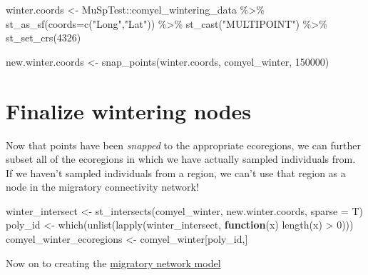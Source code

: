 \documentclass[
]{book}
\newenvironment{Shaded}{\begin{snugshade}}{\end{snugshade}}
\newcommand{\AttributeTok}[1]{\textcolor[rgb]{0.77,0.63,0.00}{#1}}
\newcommand{\ControlFlowTok}[1]{\textcolor[rgb]{0.13,0.29,0.53}{\textbf{#1}}}
\newcommand{\DecValTok}[1]{\textcolor[rgb]{0.00,0.00,0.81}{#1}}
\newcommand{\FunctionTok}[1]{\textcolor[rgb]{0.00,0.00,0.00}{#1}}
\newcommand{\NormalTok}[1]{#1}
\newcommand{\OtherTok}[1]{\textcolor[rgb]{0.56,0.35,0.01}{#1}}
\newcommand{\SpecialCharTok}[1]{\textcolor[rgb]{0.00,0.00,0.00}{#1}}
\newcommand{\StringTok}[1]{\textcolor[rgb]{0.31,0.60,0.02}{#1}}
\begin{document}
\begin{Shaded}
\begin{Highlighting}[]
\NormalTok{winter.coords }\OtherTok{\textless{}{-}}\NormalTok{ MuSpTest}\SpecialCharTok{::}\NormalTok{comyel\_wintering\_data }\SpecialCharTok{\%\textgreater{}\%}
  \FunctionTok{st\_as\_sf}\NormalTok{(}\AttributeTok{coords=}\FunctionTok{c}\NormalTok{(}\StringTok{"Long"}\NormalTok{,}\StringTok{"Lat"}\NormalTok{)) }\SpecialCharTok{\%\textgreater{}\%}
  \FunctionTok{st\_cast}\NormalTok{(}\StringTok{"MULTIPOINT"}\NormalTok{) }\SpecialCharTok{\%\textgreater{}\%}
  \FunctionTok{st\_set\_crs}\NormalTok{(}\DecValTok{4326}\NormalTok{)}
  
\NormalTok{new.winter.coords }\OtherTok{\textless{}{-}} \FunctionTok{snap\_points}\NormalTok{(winter.coords, comyel\_winter, }\DecValTok{150000}\NormalTok{)}
\end{Highlighting}
\end{Shaded}

\hypertarget{finalize-wintering-nodes}{%
\section{Finalize wintering nodes}\label{finalize-wintering-nodes}}

Now that points have been \emph{snapped} to the appropriate ecoregions, we can further subset all of the ecoregions in which we have actually sampled individuals from. If we haven't sampled individuals from a region, we can't use that region as a node in the migratory connectivity network!

\begin{Shaded}
\begin{Highlighting}[]
\NormalTok{winter\_intersect }\OtherTok{\textless{}{-}} \FunctionTok{st\_intersects}\NormalTok{(comyel\_winter, new.winter.coords, }\AttributeTok{sparse =}\NormalTok{ T)}
\NormalTok{poly\_id }\OtherTok{\textless{}{-}} \FunctionTok{which}\NormalTok{(}\FunctionTok{unlist}\NormalTok{(}\FunctionTok{lapply}\NormalTok{(winter\_intersect, }\ControlFlowTok{function}\NormalTok{(x) }\FunctionTok{length}\NormalTok{(x) }\SpecialCharTok{\textgreater{}} \DecValTok{0}\NormalTok{)))}
\NormalTok{comyel\_winter\_ecoregions }\OtherTok{\textless{}{-}}\NormalTok{ comyel\_winter[poly\_id,]}
\end{Highlighting}
\end{Shaded}

Now on to creating the \protect\hyperlink{connectivity}{migratory network model}
\end{document}
